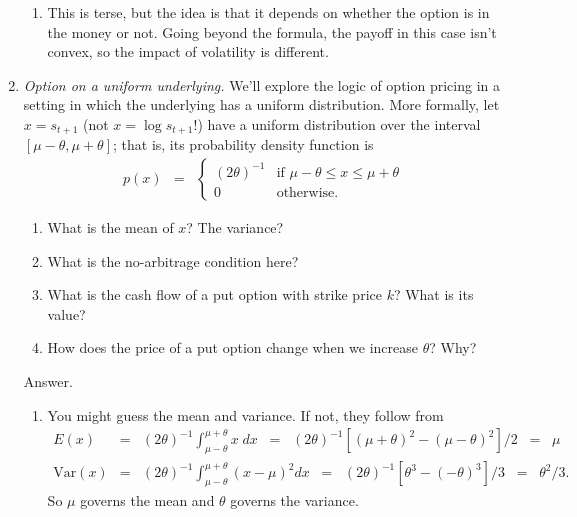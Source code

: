 \documentclass[11pt]{article}
\begin{document}
\begin{enumerate}
\begin{enumerate}
\item This is terse, but the idea is that it depends on whether
the option is in the money or not.
Going beyond the formula, the payoff in this case isn't convex,
so the impact of volatility is different.
\end{enumerate}

\item {\it Option on a uniform underlying.\/}
We'll explore the logic of option pricing in a setting in which the underlying
has a uniform distribution.
More formally, let $ x = s_{t+1} $ (not $x = \log s_{t+1}$!)
have a uniform distribution over the
interval $ [\mu-\theta, \mu + \theta]$;
that is, its probability density function is
%
\begin{eqnarray*}
    p(x) &=& \left\{
            \begin{array}{ll}
            (2\theta)^{-1} & \mbox{if } \mu-\theta \leq x \leq \mu + \theta \\
            0              & \mbox{otherwise}.
            \end{array}
            \right.
\end{eqnarray*}

\smallskip
\begin{enumerate}
\item What is the mean of $x$? The variance?
\item What is the no-arbitrage condition here?
\item What is the cash flow of a put option with strike price $k$?
What is its value?
\item How does the price of a put option change when we increase $\theta$?
Why?
\end{enumerate}

Answer.
\begin{enumerate}
\item You might guess the mean and variance.  If not, they follow from
\begin{eqnarray*}
    E(x) &=& (2\theta)^{-1} \int_{\mu-\theta}^{\mu+\theta} x \; dx
            \;\;=\;\; (2\theta)^{-1} [(\mu+\theta)^2 - (\mu-\theta)^2]/2 \;\;=\;\; \mu \\
    \mbox{Var}(x) &=& (2\theta)^{-1} \int_{\mu-\theta}^{\mu+\theta} (x-\mu)^2 dx
            \;\;=\;\; (2\theta)^{-1} [\theta^3 - (-\theta)^3]/3 \;\;=\;\; \theta^2/3 .
\end{eqnarray*}
So $\mu$ governs the mean and $\theta$ governs the variance.


\end{enumerate}
\end{enumerate}
\end{document}
